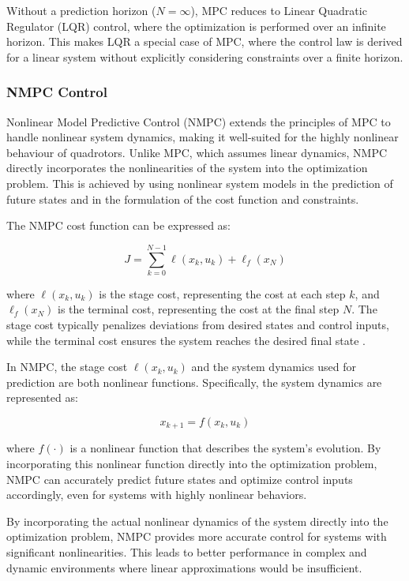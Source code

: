 \documentclass{UoNMCHA}
\numberwithin{equation}{section}
\begin{document}
Without a prediction horizon (\( N = \infty \)), MPC reduces to Linear Quadratic Regulator (LQR) control, where the optimization is performed over an infinite horizon. This makes LQR a special case of MPC, where the control law is derived for a linear system without explicitly considering constraints over a finite horizon.


\subsubsection{NMPC Control}

Nonlinear Model Predictive Control (NMPC) extends the principles of MPC to handle nonlinear system dynamics, making it well-suited for the highly nonlinear behaviour of quadrotors. Unlike MPC, which assumes linear dynamics, NMPC directly incorporates the nonlinearities of the system into the optimization problem. This is achieved by using nonlinear system models in the prediction of future states and in the formulation of the cost function and constraints.

The NMPC cost function can be expressed as:

\begin{equation}
J = \sum_{k=0}^{N-1} \ell(x_k, u_k) + \ell_f(x_N)
\label{eq:cost_function}
\end{equation}
    

where \(\ell(x_k, u_k)\) is the stage cost, representing the cost at each step \(k\), and \(\ell_f(x_N)\) is the terminal cost, representing the cost at the final step \(N\). The stage cost typically penalizes deviations from desired states and control inputs, while the terminal cost ensures the system reaches the desired final state \cite{website:NLMPC}.

In NMPC, the stage cost \(\ell(x_k, u_k)\) and the system dynamics used for prediction are both nonlinear functions. Specifically, the system dynamics are represented as:

\begin{equation}
x_{k+1} = f(x_k, u_k)
\label{eq:state_update}
\end{equation}
    

where \(f(\cdot)\) is a nonlinear function that describes the system's evolution. By incorporating this nonlinear function directly into the optimization problem, NMPC can accurately predict future states and optimize control inputs accordingly, even for systems with highly nonlinear behaviors.

By incorporating the actual nonlinear dynamics of the system directly into the optimization problem, NMPC provides more accurate control for systems with significant nonlinearities. This leads to better performance in complex and dynamic environments where linear approximations would be insufficient.
\end{document}
